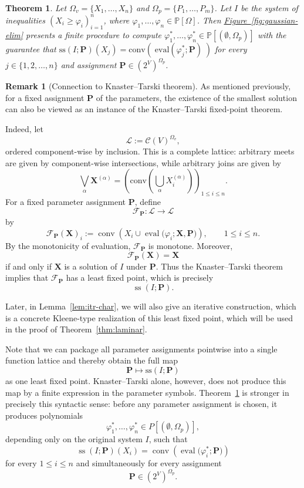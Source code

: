 \documentclass[10pt]{amsart}
\theoremstyle{plain}
\newtheorem{theorem}{Theorem}
\theoremstyle{definition}
\newtheorem{remark}[lemma]{Remark}
\providecommand{\namedref}[2]{\hyperref[#2]{#1~\ref*{#2}}\xspace}
\providecommand{\figureref}[1]{\namedref{Figure}{fig:#1}}
\providecommand{\cC}[0]{\ensuremath{\mathcal C}\xspace}
\providecommand{\bP}[0]{\ensuremath{\mathbf P}\xspace}
\let\leq\leqslant
\let\geq\geqslant
\providecommand{\conv}[1]{\ensuremath{\mathrm{conv}{\left({#1}\right)}\xspace}}
\providecommand{\convset}[0]{\ensuremath{\cC}\xspace}
\providecommand{\ssol}{\ensuremath{\mathrm{ss}}\xspace}
\providecommand{\evalmap}[0]{\ensuremath{\mathrm{eval}}\xspace}
\begin{document}
\begin{theorem}
    \label{thm:gaussian-elim}
    Let $\Omega_v = \{X_1,\dotsc,X_n\}$ and 
     $\Omega_p = \{P_1,\dotsc,P_m\}$.
    Let $I$ be the system of inequalities $(X_i\geq \varphi_i)_{i=1}^n$, where $\varphi_1,\dotsc,\varphi_n \in \mathbb{P}[\Omega]$. Then
    \figureref{gaussian-elim} presents a finite procedure to compute $\varphi^*_1,\dotsc,\varphi^*_n \in \mathbb{P}[(\emptyset,\Omega_p)]$ 
    with the guarantee that
    $\ssol(I;\bP)(X_j) = \conv{ \;\evalmap(\varphi^*_j;\bP)\; }$ for every $j\in\{1,2,\dotsc,n\}$ and assignment $\bP \in (2^V)^{\Omega_p}$.   
\end{theorem}

\begin{remark}[Connection to Knaster--Tarski theorem]
\label{rem:Knaster-Tarski}
As mentioned previously, for a fixed assignment \(\bP\) of the parameters, the existence
of the smallest solution can also be viewed as an instance of the
Knaster--Tarski fixed-point theorem.

Indeed, let
\[
\mathcal{L}:=\convset(V)^{\Omega_v},
\]
ordered component-wise by inclusion. This is a complete lattice: arbitrary
meets are given by component-wise intersections, while arbitrary joins are
given by
\[
\bigvee_{\alpha}\mathbf X^{(\alpha)}
=
\left(
\conv{
\bigcup_{\alpha}X_i^{(\alpha)}
}
\right)_{1\leq i\leq n}.
\]
For a fixed parameter assignment \(\bP\), define
\[
\mathcal F_{\mathbf P}\colon\mathcal{L}\longrightarrow\mathcal{L}
\]
by
\[
\mathcal F_{\mathbf P}(\mathbf X)_i
:=
\operatorname{conv}
\left(
X_i
\cup
\operatorname{eval}
\bigl(
\varphi_i;\mathbf X,\mathbf P
\bigr)
\right),
\qquad 1\leq i\leq n.
\]
By the monotonicity of evaluation, \(\mathcal F_{\mathbf P}\) is
monotone. Moreover,
\[
\mathcal F_{\mathbf P}(\mathbf X)=\mathbf X
\]
if and only if \(\mathbf X\) is a solution of \(I\) under
\(\mathbf P\). Thus the Knaster--Tarski theorem implies that
\(\mathcal F_{\mathbf P}\) has a least fixed point, which is precisely
\[
\operatorname{ss}(I;\mathbf P).
\]

Later, in Lemma~\ref{lem:itr-char},
we will also give an iterative construction,
which is a concrete Kleene-type realization of
this least fixed point, which will be used in the proof of Theorem~\ref{thm:laminar}.

Note that we can package all parameter assignments pointwise into a
single function lattice and thereby obtain the full map
\[
\bP \mapsto \ssol(I;\bP)
\]
as one least fixed point. 
Knaster–Tarski alone, however, does not produce this map by a finite expression in the parameter symbols. 
Theorem~\ref{thm:gaussian-elim} is stronger in precisely this syntactic
sense: before any parameter assignment is chosen,
it produces polynomials
\[
\varphi_1^*,\ldots,\varphi_n^*
\in
P[(\emptyset,\Omega_p)],
\]
depending only on the original system \(I\), such that
\[
\operatorname{ss}(I;\mathbf P)(X_i)
=
\operatorname{conv}
\left(
\operatorname{eval}
\bigl(
\varphi_i^*;\mathbf P
\bigr)
\right)
\]
for every \(1\leq i\leq n\) and simultaneously for every assignment
\[
\mathbf P\in (2^V)^{\Omega_p}.
\]


\end{remark}
\end{document}
